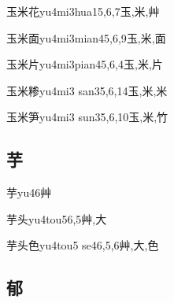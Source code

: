 \begin{EntryWithPhonetic}{玉米花}{yu4mi3hua1}{5,6,7}{⽟,⽶,⾋}
\end{EntryWithPhonetic}

\begin{EntryWithPhonetic}{玉米面}{yu4mi3mian4}{5,6,9}{⽟,⽶,⾯}
\end{EntryWithPhonetic}

\begin{EntryWithPhonetic}{玉米片}{yu4mi3pian4}{5,6,4}{⽟,⽶,⽚}
\end{EntryWithPhonetic}

\begin{EntryWithPhonetic}{玉米糁}{yu4mi3 san3}{5,6,14}{⽟,⽶,⽶}
\end{EntryWithPhonetic}

\begin{EntryWithPhonetic}{玉米笋}{yu4mi3 sun3}{5,6,10}{⽟,⽶,⽵}
\end{EntryWithPhonetic}

\subsection*{芋}

\begin{EntryWithPhonetic}{芋}{yu4}{6}{⾋}
\end{EntryWithPhonetic}

\begin{EntryWithPhonetic}{芋头}{yu4tou5}{6,5}{⾋,⼤}
\end{EntryWithPhonetic}

\begin{EntryWithPhonetic}{芋头色}{yu4tou5 se4}{6,5,6}{⾋,⼤,⾊}
\end{EntryWithPhonetic}

\subsection*{郁}


